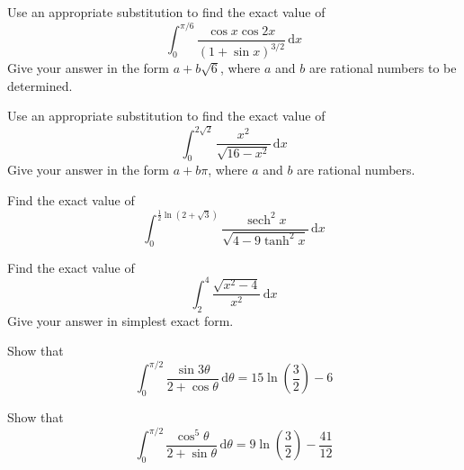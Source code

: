 \documentclass[leqno]{article}
\begin{document}
\begin{enumerate}[
  label=\textbf{\arabic*.},
  leftmargin=*,
  topsep=0pt,
  partopsep=0pt,
  parsep=0pt
]
Use an appropriate substitution to find the exact value of
\[
\int_0^{\pi/6} \frac{\cos x\cos 2x}{(1 + \sin x)^{3/2}}\,\mathrm{d}x
\]
Give your answer in the form $a+b\sqrt{6}$, where $a$ and $b$ are rational numbers to be determined.  \\

\newpage

\questionitem

Use an appropriate substitution to find the exact value of
\[
\int_0^{2\sqrt{2}} \frac{x^2}{\sqrt{16-x^2}}\,\mathrm{d}x
\]
Give your answer in the form $a+b\pi$, where $a$ and $b$ are rational numbers.  \\

\newpage

\questionitem

Find the exact value of 
\[
\int_0^{\frac{1}{2}\ln(2+\sqrt{3})} \frac{\operatorname{sech}^2 x}{\sqrt{4 - 9\tanh^2 x}}\,\mathrm{d}x
\]

\newpage

\questionitem

Find the exact value of
\[
\int_2^4 \frac{\sqrt{x^2-4}}{x^2} \, \mathrm{d}x
\]
Give your answer in simplest exact form. 

\newpage

\questionitem

Show that
\[
\int_0^{\pi/2} \frac{\sin 3\theta}{2 + \cos \theta}\,\mathrm{d}\theta = 15\ln\left(\frac{3}{2}\right) - 6
\]

\newpage

\questionitem

Show that
\[
\int_0^{\pi/2} \frac{\cos^5 \theta}{2 + \sin \theta}\,\mathrm{d}\theta = 9\ln\left(\frac{3}{2}\right) - \frac{41}{12}
\]
\end{enumerate}
\end{document}
